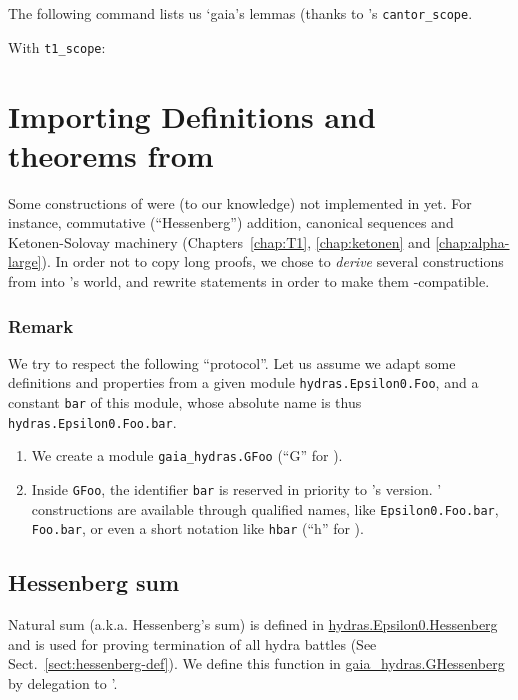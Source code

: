 The following command lists us `gaia's lemmas (thanks to
\gaia's  \texttt{cantor\_scope}.

With \texttt{t1\_scope}:


\section{Importing Definitions and theorems from \HydrasLib}

Some constructions of \HydrasLib were (to our knowledge) not implemented in \gaia yet. For instance, commutative (``Hessenberg'') addition, canonical sequences and Ketonen-Solovay machinery (Chapters~\ref{chap:T1}, \ref{chap:ketonen} and \ref{chap:alpha-large}). In order not to copy long proofs, we chose to
\emph{derive} several constructions from \HydrasLib into \gaia's world, and rewrite \HydrasLib statements in order to make them \gaia-compatible.


\subsubsection{Remark}
\label{sect:gaia-masking}
We try to respect the following ``protocol''.
Let us assume we adapt some definitions and properties
from a given module \texttt{hydras.Epsilon0.Foo}, and a constant \texttt{bar} of this module, whose absolute name is
thus \texttt{hydras.Epsilon0.Foo.bar}.
\begin{enumerate}
\item We create a module \texttt{gaia\_hydras.GFoo}
  (``G'' for \gaia).
\item Inside \texttt{GFoo}, the identifier \texttt{bar}
  is reserved in priority to \gaia's version.
\HydrasLib' constructions are available through qualified names, like \texttt{Epsilon0.Foo.bar}, \texttt{Foo.bar}, or even a short notation like \texttt{hbar}  (``h'' for \HydrasLib).
\end{enumerate}

\subsection{Hessenberg sum}

Natural sum  (a.k.a. Hessenberg's  sum) is defined in
\href{../theories/html/hydras.Epsilon0.Hessenberg.html}{hydras.Epsilon0.Hessenberg} and is used for proving termination of all hydra battles (See Sect.~\ref{sect:hessenberg-def}).
We define this function in \href{../theories/html/gaia\_hydras.GHessenberg.html}{gaia\_hydras.GHessenberg} by delegation to \HydrasLib'.

